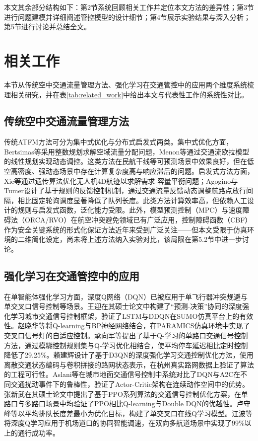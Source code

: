 \documentclass[12pt,a4paper,UTF8]{ctexart}
\begin{document}
本文其余部分结构如下：第2节系统回顾相关工作并定位本文方法的差异性；第3节进行问题建模并详细阐述管控模型的设计细节；第4节展示实验结果与深入分析；第5节进行讨论并总结全文。

\section{相关工作}

本节从传统空中交通流量管理方法、强化学习在交通管控中的应用两个维度系统梳理相关研究，并在表\ref{tab:related_work}中给出本文与代表性工作的系统性对比。

\subsection{传统空中交通流量管理方法}

传统ATFM方法可分为集中式优化与分布式启发式两类。集中式优化方面，Bertsimas等采用整数规划求解空域流量分配问题，Menon等通过交通流欧拉模型的线性规划实现动态调控\cite{ref6}。这类方法在民航干线等可预测场景中效果良好，但在低空高密度、强动态场景中存在计算复杂度高与响应滞后的问题。启发式方法方面，Xie等通过遗传算法优化无人机4D航迹以求解需求-容量平衡问题\cite{ref6}；Agogino与Tumer设计了基于规则的反馈控制机制，通过交通流量反馈动态调整航路点放行间隔，相比固定轮询调度显著降低了队列长度\cite{ref4}。此类方法计算效率高，但依赖人工设计的规则与启发式函数，泛化能力受限。此外，模型预测控制（MPC）与速度障碍法（ORCA/RVO）\cite{ref22}在航空冲突避免领域已有广泛应用，控制障碍函数（CBF）\cite{ref23}作为安全关键系统的形式化保证方法近年来受到广泛关注——但本文受限于仿真环境的二维简化设定，尚未将上述方法纳入实验对比，该局限在第5.2节中进一步讨论。

\subsection{强化学习在交通管控中的应用}

在单智能体强化学习方面，深度Q网络（DQN）已被应用于单飞行器冲突规避与单交叉口信号控制等场景。王迎在其硕士论文中构建了``预测-决策''协同的深度强化学习城市交通信号控制框架，验证了LSTM与DDQN在SUMO仿真平台上的有效性\cite{ref13}。赵晓华等将Q-learning与BP神经网络结合，在PARAMICS仿真环境中实现了交叉口信号灯的自适应控制\cite{ref14}。承向军等提出了基于Q-学习的单路口交通信号控制方法，通过模糊控制规则集与Q-学习优化相结合，使平均停车延迟相比定时控制降低了29.25\%\cite{ref15}。赖建辉设计了基于D3QN的深度强化学习交通控制优化方法，使用离散交通状态编码与卷积拼接的路网状态表示，在杭州真实路网数据上验证了算法的工程可行性\cite{ref16}。Aslani等在城市地面交通信号控制中系统对比了DQN与A2C在不同交通扰动事件下的鲁棒性，验证了Actor-Critic架构在连续动作空间中的优势\cite{ref10}。张新武在其硕士论文中提出了基于PPO系列算法的交通信号控制优化方案\cite{ref17}，在单路口与多路口场景中均验证了PPO相比Q-learning与Double DQN的优越性。卢守峰等以平均排队长度差最小为优化目标，构建了单交叉口在线Q学习模型\cite{ref18}。江波等将深度Q学习应用于机场道口的协同智能调速，在双向多航道场景中实现了99\%以上的通行成功率\cite{ref19}。
\end{document}
